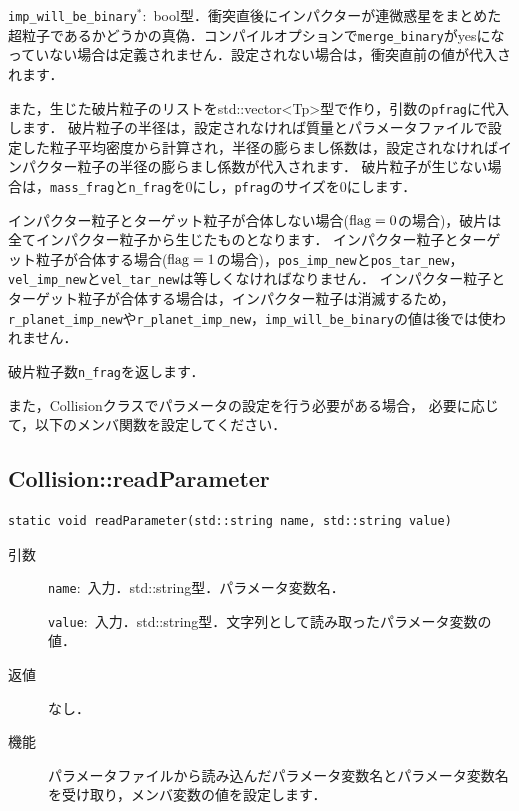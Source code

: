 \documentclass[12pt,a4paper,dvipdfmx]{jsarticle}
\begin{document}
\begin{description}
\begin{itemize}
\texttt{imp\_will\_be\_binary}${}^{*}$:\ bool型．衝突直後にインパクターが連微惑星をまとめた超粒子であるかどうかの真偽．コンパイルオプションで\texttt{merge\_binary}がyesになっていない場合は定義されません．設定されない場合は，衝突直前の値が代入されます．
\\

\end{itemize}

また，生じた破片粒子のリストをstd::vector<Tp>型で作り，引数の\texttt{pfrag}に代入します．
破片粒子の半径は，設定されなければ質量とパラメータファイルで設定した粒子平均密度から計算され，半径の膨らまし係数は，設定されなければインパクター粒子の半径の膨らまし係数が代入されます．
破片粒子が生じない場合は，\texttt{mass\_frag}と\texttt{n\_frag}を0にし，\texttt{pfrag}のサイズを0にします．

インパクター粒子とターゲット粒子が合体しない場合(${\rm flag}=0$の場合)，破片は全てインパクター粒子から生じたものとなります．
インパクター粒子とターゲット粒子が合体する場合(${\rm flag}=1$の場合)，\texttt{pos\_imp\_new}と\texttt{pos\_tar\_new}，\texttt{vel\_imp\_new}と\texttt{vel\_tar\_new}は等しくなければなりません．
インパクター粒子とターゲット粒子が合体する場合は，インパクター粒子は消滅するため，\texttt{r\_planet\_imp\_new}や\texttt{r\_planet\_imp\_new}，\texttt{imp\_will\_be\_binary}の値は後では使われません．

破片粒子数\texttt{n\_frag}を返します．
\end{description}


また，Collisionクラスでパラメータの設定を行う必要がある場合，
必要に応じて，以下のメンバ関数を設定してください．
\subsection{Collision::readParameter}

\begin{screen}
\begin{verbatim}
static void readParameter(std::string name, std::string value)
\end{verbatim}
\end{screen}

\begin{description}
\item[引数]

\texttt{name}:\ 入力．std::string型．パラメータ変数名．

\texttt{value}:\ 入力．std::string型．文字列として読み取ったパラメータ変数の値．

\item[返値]

なし．
\item[機能]

パラメータファイルから読み込んだパラメータ変数名とパラメータ変数名を受け取り，メンバ変数の値を設定します．
\end{description}
\end{document}
